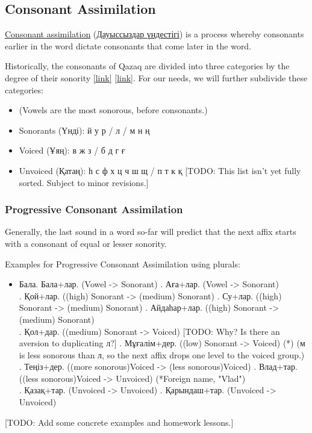 \documentclass[main.tex]{subfiles}
\begin{document}
\subsection{Consonant Assimilation}
\href{https://en.wikipedia.org/wiki/Consonant_harmony}{Consonant assimilation} (\href{https://kk.wikipedia.org/wiki/\%D0\%94\%D0\%B0\%D1\%83\%D1\%8B\%D1\%81\%D1\%81\%D1\%8B\%D0\%B7\%D0\%B4\%D0\%B0\%D1\%80_\%D2\%AF\%D0\%BD\%D0\%B4\%D0\%B5\%D1\%81\%D1\%82\%D1\%96\%D0\%B3\%D1\%96}{Дауыссыздар үндестігі}) is a process whereby consonants earlier in the word dictate consonants that come later in the word.

Historically, the consonants of Qazaq are divided into three categories by the degree of their sonority  \href{https://oozcelik.pages.iu.edu/papers/Kazakh\%20phonology.pdf}{[link]} \href{https://itest.kz/kz/ent/qazaq-tili/fonetika/lecture/dauyssyz-dybystar-qatang-uyang-undi-dauyssyzdar-emlesi}{[link]}. For our needs, we will further subdivide these categories:
\begin{itemize}
	\item (Vowels are the most sonorous, before consonants.)
	\item Sonorants (Үнді): й у р / л / м н ң
	\item Voiced (Ұяң): в ж з / б д г ғ
	\item Unvoiced (Қатаң): һ с ф х ц ч ш щ / п т к қ [TODO: This list isn't yet fully sorted. Subject to minor revisions.]
\end{itemize}

\subsubsection{Progressive Consonant Assimilation}
Generally, the last sound in a word so-far will predict that the next affix starts with a consonant of equal or lesser sonority.

Examples for Progressive Consonant Assimilation using plurals:
\begin{itemize}
\item Бала. Бала+лар. (Vowel -> Sonorant)
. Аға+лар. (Vowel -> Sonorant)
\\
. Қой+лар. ((high) Sonorant -> (medium) Sonorant)
. Су+лар. ((high) Sonorant -> (medium) Sonorant)
. Айдаһар+лар. ((high) Sonorant -> (medium) Sonorant)
\\
. Қол+дар. ((medium) Sonorant -> Voiced) [TODO: Why? Is there an aversion to duplicating л?]
. Мұғалім+дер. ((low) Sonorant -> Voiced) (*) (м is less sonorous than л, so the next affix drops one level to the voiced group.)
\\
. Теңіз+дер. ((more sonorous)Voiced -> (less sonorous)Voiced)
. Влад+тар. ((less sonorous)Voiced -> Unvoiced) (*Foreign name, "Vlad")
\\
. Қазақ+тар. (Unvoiced -> Unvoiced)
. Қарындаш+тар. (Unvoiced -> Unvoiced)
\end{itemize}

[TODO: Add some concrete examples and homework lessons.]
\end{document}
